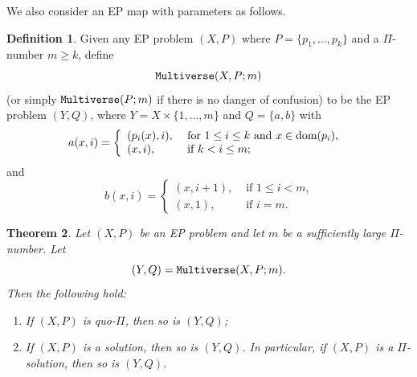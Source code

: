 \documentclass[10pt,a4paper]{amsart}
\newtheorem{theorem}{Theorem}[section]
\theoremstyle{definition}
\newtheorem{definition}[theorem]{Definition}
\newcommand{\dom}{{\mbox{\rm dom}}}
\theoremstyle{definition}
\numberwithin{equation}{section}
\begin{document}
We also consider an EP map with parameters as follows.

\begin{definition}\label{def:multiverse2} Given any EP problem $(X, P)$ where $P=\{p_1,\dots, p_k\}$ and a $\Pi$-number $m\geq k$, define 
$${\tt Multiverse}(X, P; m)$$ (or simply $\mbox{\tt Multiverse}(P; m)$ if there is no danger of confusion) to be the EP problem $(Y, Q)$, where $Y=X\times\{1,\dots, m\}$ and $Q=\{a, b\}$
with
$$ a(x,i)= \left\{\begin{array}{ll} (p_i(x),i), &\mbox{ for $1\leq i\leq k$ and $x\in\dom(p_i)$, } \\
(x, i), & \mbox{ if $k<i\leq m$;} \end{array}\right. 
$$
and 
$$ 
b(x,i)=\left\{\begin{array}{ll} (x, i+1), & \mbox{ if $1\leq i<m$,} \\ (x, 1), & \mbox{ if $i=m$.}\end{array}\right.
$$
\end{definition}

\begin{theorem}\label{thm:multiverse2} Let $(X, P)$ be an EP problem and let $m$ be a sufficiently large $\Pi$-number. Let
$$ (Y, Q)={\tt Multiverse}(X, P; m). $$
Then the following hold:
\begin{enumerate}
\item[\rm (i)] If $(X, P)$ is quo-$\Pi$, then so is $(Y, Q)$;
\item[\rm (ii)] If $(X, P)$ is a solution, then so is $(Y, Q)$. In particular, if $(X, P)$ is a $\Pi$-solution, then so is $(Y, Q)$.
\end{enumerate}
\end{theorem}
\end{document}
